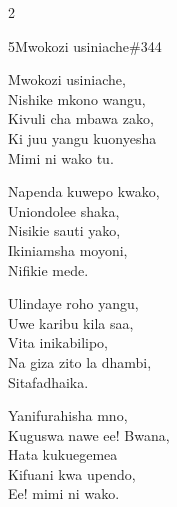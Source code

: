 \begin{multicols}{2}
\begin{hymn}{5}{Mwokozi usiniache}{\#344}
\begin{stanza}
Mwokozi usiniache,\\
Nishike mkono wangu,\\
Kivuli cha mbawa zako,\\
Ki juu yangu kuonyesha\\
Mimi ni wako tu.
\end{stanza}
\begin{stanza}
Napenda kuwepo kwako,\\
Uniondolee shaka,\\
Nisikie sauti yako,\\
Ikiniamsha moyoni,\\
Nifikie mede.
\end{stanza}
\begin{stanza}
Ulindaye roho yangu,\\
Uwe karibu kila saa,\\
Vita inikabilipo,\\
Na giza zito la dhambi,\\
Sitafadhaika.
\end{stanza}
\begin{stanza}
Yanifurahisha mno,\\
Kuguswa nawe ee! Bwana,\\
Hata kukuegemea\\
Kifuani kwa upendo,\\
Ee! mimi ni wako.
\end{stanza}
\end{hymn}


\end{multicols}

